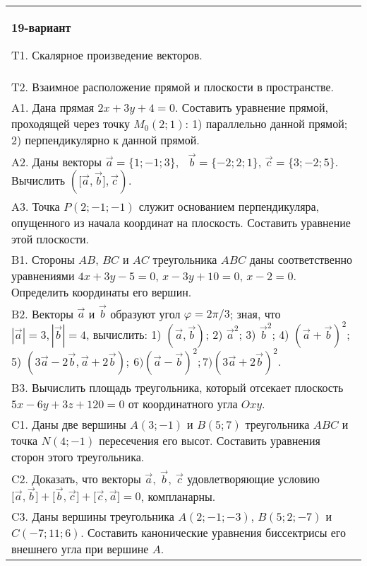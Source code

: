 \documentclass{article}
\begin{document}
\begin{tabular}{m{17cm}}
\textbf{19-вариант}
\newline

T1. 
Скалярное произведение векторов.
 \\
T2. 
Взаимное расположение прямой и плоскости в пространстве.
 \\
A1. 
Дана прямая \(2x + 3y + 4 = 0\). Составить уравнение прямой, проходящей через точку \(M_{0}(2;1)\): 1) параллельно данной прямой; 2) перпендикулярно к данной прямой.
 \\
A2. 
Даны векторы \(\overrightarrow{a} = \{ 1; - 1;3\},\ \ \ \overrightarrow{b} = \{ - 2;2;1\}\), \(\overrightarrow{c} = \{ 3; - 2;5\}\). Вычислить \((\lbrack\overrightarrow{a},\overrightarrow{b}\rbrack,\overrightarrow{c})\).
 \\
A3. 
Точка \(P(2; - 1; - 1)\) служит основанием перпендикуляра, опущенного из начала координат на плоскость. Составить уравнение этой плоскости.
 \\
B1. 
Стороны \(AB\), \(BC\) и \(AC\) треугольника \(ABC\) даны соответственно уравнениями \(4x + 3y - 5 = 0\), \(x - 3y + 10 = 0\), \(x - 2 = 0\). Определить координаты его вершин.
 \\
B2. 
Векторы \(\overrightarrow{a}\) и \(\overrightarrow{b}\) образуют угол \(\varphi = 2\pi/3\); зная, что \(|\overrightarrow{a}| = 3,|\overrightarrow{b}| = 4\), вычислить: 1) \(\left( \overrightarrow{a},\overrightarrow{b} \right)\); 2) \({\overrightarrow{a}}^{2}\); 3) \({\overrightarrow{b}}^{2}\); 4) \((\overrightarrow{a} + \overrightarrow{b})^{2}\); 5) \(\left( 3\overrightarrow{a} - 2\overrightarrow{b},\overrightarrow{a} + 2\overrightarrow{b} \right);\ 6)(\overrightarrow{a} - \overrightarrow{b})^{2};7)(3\overrightarrow{a} + 2\overrightarrow{b})^{2}\).
 \\
B3. 
Вычислить площадь треугольника, который отсекает плоскость \(5x - 6y + 3z + 120 = 0\) от координатного угла \(Oxy\).
 \\
C1. 
Даны две вершины \(A(3; - 1)\) и \(B(5;7)\) треугольника \(ABC\) и точка \(N(4; - 1)\) пересечения его высот. Составить уравнения сторон этого треугольника.
 \\
C2. 
Доказать, что векторы \(\overrightarrow{a},\ \overrightarrow{b},\ \overrightarrow{c}\) удовлетворяющие условию \(\lbrack\overrightarrow{a},\overrightarrow{b}\rbrack + \lbrack\overrightarrow{b},\overrightarrow{c}\rbrack + \lbrack\overrightarrow{c},\overrightarrow{a}\rbrack = 0\), компланарны.
 \\
C3. 
Даны вершины треугольника \(A(2; - 1; - 3)\), \(B(5;2; - 7)\) и \(C( - 7;11;6)\). Составить канонические уравнения биссектрисы его внешнего угла при вершине \(A\).
 \\

\end{tabular}
\vspace{1cm}
\end{document}
